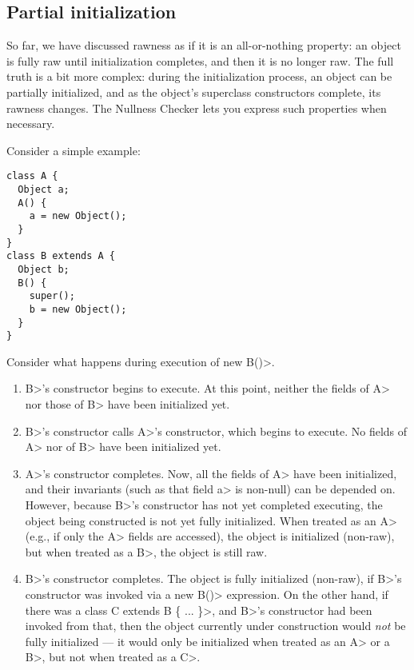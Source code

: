 

\subsection{Partial initialization\label{partial-initialization}}

So far, we have discussed rawness as if it is an all-or-nothing property:
an object is fully raw until initialization completes, and then it is no
longer raw.  The full truth is a bit more complex:  during the
initialization process, an object can be partially initialized, and as the
object's superclass constructors complete, its rawness changes.  The
Nullness Checker lets you express such properties when necessary.

Consider a simple example:

\begin{Verbatim}
class A {
  Object a;
  A() {
    a = new Object();
  }
}
class B extends A {
  Object b;
  B() {
    super();
    b = new Object();
  }
}
\end{Verbatim}

Consider what happens during execution of \<new B()>.

\begin{enumerate}
\item \<B>'s constructor begins to execute.  At this point, neither the
  fields of \<A> nor those of \<B> have been initialized yet.
\item \<B>'s constructor calls \<A>'s constructor, which begins to execute.
  No fields of \<A> nor of \<B> have been initialized yet.
\item \<A>'s constructor completes.  Now, all the fields of \<A> have been
  initialized, and their invariants (such as that field \<a> is non-null) can be
  depended on.  However, because \<B>'s constructor has not yet completed
  executing, the object being constructed is not yet fully initialized.
  When treated as an \<A> (e.g., if only the \<A> fields are accessed), the
  object is initialized (non-raw), but when treated as a \<B>, the object
  is still raw.
\item \<B>'s constructor completes.  The object is fully initialized
  (non-raw), if \<B>'s constructor was invoked via a \<new B()>
  expression.  On the other hand, if there was a \<class C extends B \{
  ... \}>, and \<B>'s constructor had been invoked from that, then the
  object currently under construction would \emph{not} be fully initialized
  --- it would only be initialized when treated as an \<A> or a \<B>, but
  not when treated as a \<C>.
\end{enumerate}

